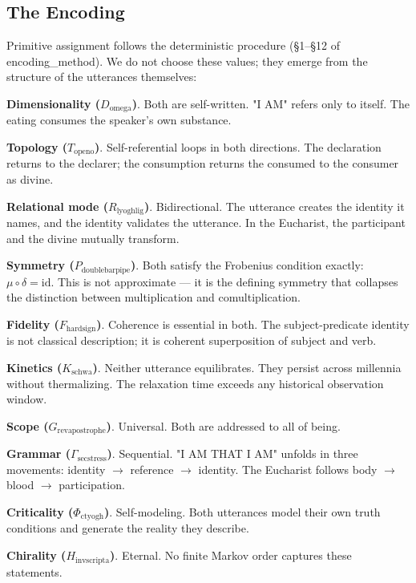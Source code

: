 \documentclass[12pt,a4paper]{article}
\newcommand{\pilcrow}{\S}
\begin{document}
\subsection{The Encoding}

Primitive assignment follows the deterministic procedure (\pilcrow{}1--\pilcrow{}12 of encoding\_method). We do not choose these values; they emerge from the structure of the utterances themselves:

\textbf{Dimensionality ($D_{\text{omega}}$)}. Both are self-written. "I AM" refers only to itself. The eating consumes the speaker's own substance.

\textbf{Topology ($T_{\text{openo}}$)}. Self-referential loops in both directions. The declaration returns to the declarer; the consumption returns the consumed to the consumer as divine.

\textbf{Relational mode ($R_{\text{lyoghlig}}$)}. Bidirectional. The utterance creates the identity it names, and the identity validates the utterance. In the Eucharist, the participant and the divine mutually transform.

\textbf{Symmetry ($P_{\text{doublebarpipe}}$)}. Both satisfy the Frobenius condition exactly: $\mu \circ \delta = \text{id}$. This is not approximate --- it is the defining symmetry that collapses the distinction between multiplication and comultiplication.

\textbf{Fidelity ($F_{\text{hardsign}}$)}. Coherence is essential in both. The subject-predicate identity is not classical description; it is coherent superposition of subject and verb.

\textbf{Kinetics ($K_{\text{schwa}}$)}. Neither utterance equilibrates. They persist across millennia without thermalizing. The relaxation time exceeds any historical observation window.

\textbf{Scope ($G_{\text{revapostrophe}}$)}. Universal. Both are addressed to all of being.

\textbf{Grammar ($\Gamma_{\text{secstress}}$)}. Sequential. "I AM THAT I AM" unfolds in three movements: identity $\rightarrow$ reference $\rightarrow$ identity. The Eucharist follows body $\rightarrow$ blood $\rightarrow$ participation.

\textbf{Criticality ($\Phi_{\text{ctyogh}}$)}. Self-modeling. Both utterances model their own truth conditions and generate the reality they describe.

\textbf{Chirality ($H_{\text{invscripta}}$)}. Eternal. No finite Markov order captures these statements.
\end{document}
